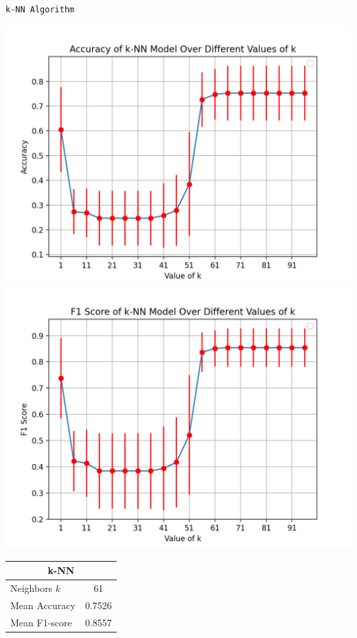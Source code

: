 \documentclass{article}
\begin{document}
\begin{center}
    \texttt{k-NN Algorithm}
\end{center}
\begin{minipage}{0.49\textwidth}
    \centering

    \includegraphics*[width=\textwidth]{./src/figures/Accuracy Parkinsons.png}
    \includegraphics*[width=\textwidth]{./src/figures/F-Score Parkinsons.png}

    \begin{tabular}{lc}
        \toprule
        \multicolumn{2}{c}{k-NN} \\
        \midrule
        Neighbors $k$ & 61 \\
        Mean Accuracy & 0.7526 \\
        Mean F1-score & 0.8557 \\
        \bottomrule
    \end{tabular}
\end{minipage}
\end{document}
